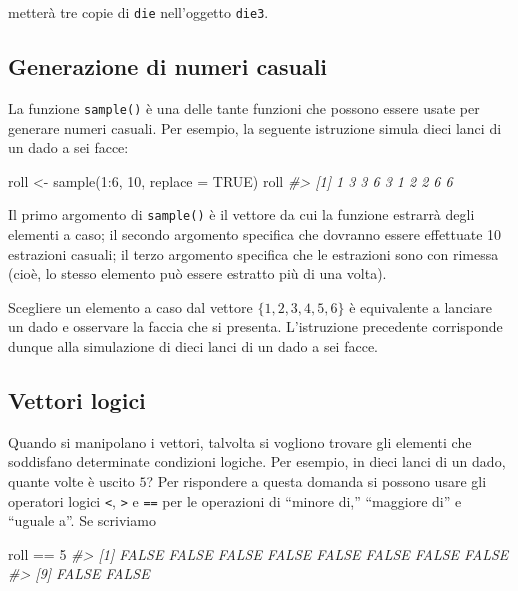 \documentclass[
  11pt,
]{krantz}
\makeatletter
\newenvironment{Shaded}{\begin{snugshade}}{\end{snugshade}}
\newcommand{\AttributeTok}[1]{\textcolor[rgb]{0.61,0.61,0.61}{#1}}
\newcommand{\CommentTok}[1]{\textcolor[rgb]{0.37,0.37,0.37}{\textit{#1}}}
\newcommand{\ConstantTok}[1]{\textcolor[rgb]{0,0,0}{#1}}
\newcommand{\DecValTok}[1]{\textcolor[rgb]{0.06,0.06,0.06}{#1}}
\newcommand{\FunctionTok}[1]{\textcolor[rgb]{0,0,0}{#1}}
\newcommand{\NormalTok}[1]{#1}
\newcommand{\OtherTok}[1]{\textcolor[rgb]{0.37,0.37,0.37}{#1}}
\newcommand{\SpecialCharTok}[1]{\textcolor[rgb]{0,0,0}{#1}}
\newenvironment{kframe}{%
\medskip{}
\setlength{\fboxsep}{.8em}
 \def\at@end@of@kframe{}%
 \ifinner\ifhmode%
  \def\at@end@of@kframe{\end{minipage}}%
  \begin{minipage}{\columnwidth}%
 \fi\fi%
 \def\FrameCommand##1{\hskip\@totalleftmargin \hskip-\fboxsep
 \colorbox{shadecolor}{##1}\hskip-\fboxsep
     \hskip-\linewidth \hskip-\@totalleftmargin \hskip\columnwidth}%
 \MakeFramed {\advance\hsize-\width
   \@totalleftmargin\z@ \linewidth\hsize
   \@setminipage}}%
 {\par\unskip\endMakeFramed%
 \at@end@of@kframe}
\renewenvironment{Shaded}{\begin{kframe}}{\end{kframe}}
\theoremstyle{definition}
\theoremstyle{definition}
\theoremstyle{definition}
\theoremstyle{definition}
\theoremstyle{remark}
\makeatother
\begin{document}
metterà tre copie di \texttt{die} nell'oggetto \texttt{die3}.

\hypertarget{generazione-di-numeri-casuali}{%
\subsection{Generazione di numeri casuali}\label{generazione-di-numeri-casuali}}

La funzione \texttt{sample()} è una delle tante funzioni che possono essere usate per generare numeri casuali. Per esempio, la seguente istruzione simula dieci lanci di un dado a sei facce:

\begin{Shaded}
\begin{Highlighting}[]
\NormalTok{roll }\OtherTok{\textless{}{-}} \FunctionTok{sample}\NormalTok{(}\DecValTok{1}\SpecialCharTok{:}\DecValTok{6}\NormalTok{, }\DecValTok{10}\NormalTok{, }\AttributeTok{replace =} \ConstantTok{TRUE}\NormalTok{)}
\NormalTok{roll}
\CommentTok{\#\textgreater{}  [1] 1 3 3 6 3 1 2 2 6 6}
\end{Highlighting}
\end{Shaded}

Il primo argomento di \texttt{sample()} è il vettore da cui la funzione estrarrà degli elementi a caso; il secondo argomento specifica che dovranno essere effettuate 10 estrazioni casuali; il terzo argomento specifica che le estrazioni sono con rimessa (cioè, lo stesso elemento può essere estratto più di una volta).

Scegliere un elemento a caso dal vettore \(\{1, 2, 3, 4, 5, 6\}\) è equivalente a lanciare un dado e osservare la faccia che si presenta. L'istruzione precedente corrisponde dunque alla simulazione di dieci lanci di un dado a sei facce.

\hypertarget{vettori-logici}{%
\subsection{Vettori logici}\label{vettori-logici}}

Quando si manipolano i vettori, talvolta si vogliono trovare gli elementi che soddisfano determinate condizioni logiche. Per esempio, in dieci lanci di un dado, quante volte è uscito \(5\)? Per rispondere a questa domanda si possono usare gli operatori logici \texttt{\textless{}}, \texttt{\textgreater{}} e \texttt{==} per le operazioni di ``minore di,'' ``maggiore di'' e ``uguale a''. Se scriviamo

\begin{Shaded}
\begin{Highlighting}[]
\NormalTok{roll }\SpecialCharTok{==} \DecValTok{5}
\CommentTok{\#\textgreater{}  [1] FALSE FALSE FALSE FALSE FALSE FALSE FALSE FALSE}
\CommentTok{\#\textgreater{}  [9] FALSE FALSE}
\end{Highlighting}
\end{Shaded}
\end{document}
